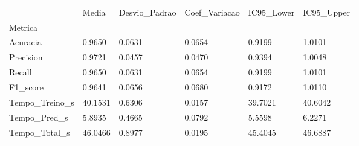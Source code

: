 \begin{tabular}{llllll}
\toprule
 & Media & Desvio_Padrao & Coef_Variacao & IC95_Lower & IC95_Upper \\
Metrica &  &  &  &  &  \\
\midrule
Acuracia & 0.9650 & 0.0631 & 0.0654 & 0.9199 & 1.0101 \\
Precision & 0.9721 & 0.0457 & 0.0470 & 0.9394 & 1.0048 \\
Recall & 0.9650 & 0.0631 & 0.0654 & 0.9199 & 1.0101 \\
F1_score & 0.9641 & 0.0656 & 0.0680 & 0.9172 & 1.0110 \\
Tempo_Treino_s & 40.1531 & 0.6306 & 0.0157 & 39.7021 & 40.6042 \\
Tempo_Pred_s & 5.8935 & 0.4665 & 0.0792 & 5.5598 & 6.2271 \\
Tempo_Total_s & 46.0466 & 0.8977 & 0.0195 & 45.4045 & 46.6887 \\
\bottomrule
\end{tabular}

